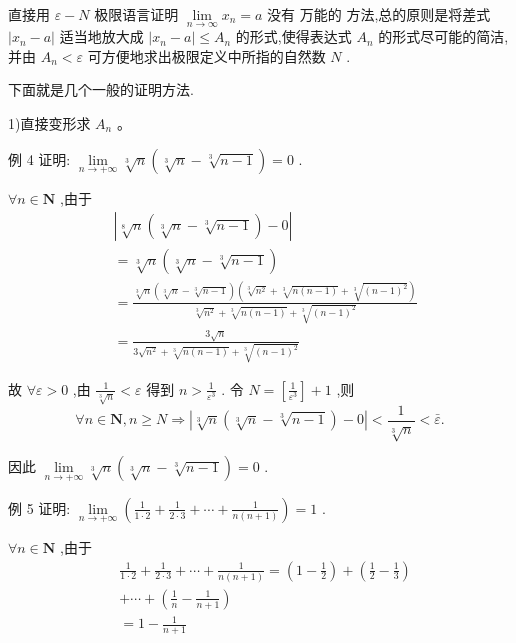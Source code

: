 直接用 $\varepsilon  - N$ 极限语言证明 $\mathop{\lim }\limits_{{n \rightarrow  \infty }}{x}_{n} = a$ 没有 万能的 方法,总的原则是将差式 $\left| {{x}_{n} - a}\right|$ 适当地放大成 $\left| {{x}_{n} - a}\right|  \leq  {A}_{n}$ 的形式,使得表达式 ${A}_{n}$ 的形式尽可能的简洁,并由 ${A}_{n} < \varepsilon$ 可方便地求出极限定义中所指的自然数 $N$ .

下面就是几个一般的证明方法.

1)直接变形求 ${A}_{n}$ 。

例 4 证明: $\mathop{\lim }\limits_{{n \rightarrow   + \infty }}\sqrt[3]{n}\left( {\sqrt[3]{n} - \sqrt[3]{n - 1}}\right)  = 0$ .

$\forall n \in  \mathbf{N}$ ,由于
\begin{align*}
	&\left| {\sqrt[8]{n}\left( {\sqrt[3]{n} - \sqrt[3]{n - 1}}\right)  - 0}\right|\\
	&= \sqrt[3]{n}\left( {\sqrt[3]{n} - \sqrt[3]{n - 1}}\right)\\
	&= \frac{\sqrt[3]{n}\left( {\sqrt[3]{n} - \sqrt[3]{n - 1}}\right) \left( {\sqrt[3]{{n}^{2}} + \sqrt[3]{n\left( {n - 1}\right) } + \sqrt[3]{{\left( n - 1\right) }^{2}}}\right) }{\sqrt[3]{{n}^{2}} + \sqrt[3]{n\left( {n - 1}\right) } + \sqrt[3]{{\left( n - 1\right) }^{2}}}\\
	&= \frac{3\sqrt{n}}{3\sqrt{{n}^{2}} + \sqrt[3]{n\left( {n - 1}\right) } + \sqrt[3]{{\left( n - 1\right) }^{2}}}
\end{align*}

故 $\forall \varepsilon  > 0$ ,由 $\frac{1}{\sqrt[3]{n}} < \varepsilon$ 得到 $n > \frac{1}{{\varepsilon }^{3}}$ . 令 $N = \left\lbrack  \frac{1}{{\varepsilon }^{3}}\right\rbrack   + 1$ ,则
$$\forall n \in  \mathbf{N},n \geq  N \Rightarrow  \left| {\sqrt[3]{n}\left( {\sqrt[3]{n} - \sqrt[3]{n - 1}}\right)  - 0}\right|  < \frac{1}{\sqrt[3]{n}} < \bar{\varepsilon }.$$

因此 $\mathop{\lim }\limits_{{n \rightarrow   + \infty }}\sqrt[3]{n}\left( {\sqrt[3]{n} - \sqrt[3]{n - 1}}\right)  = 0$ .

例 5 证明: $\mathop{\lim }\limits_{{n \rightarrow   + \infty }}\left( {\frac{1}{1 \cdot  2} + \frac{1}{2 \cdot  3} + \cdots  + \frac{1}{n\left( {n + 1}\right) }}\right)  = 1$ .

$\forall n \in  \mathbf{N}$ ,由于
\begin{align*}
	&\frac{1}{1 \cdot  2} + \frac{1}{2 \cdot  3} + \cdots  + \frac{1}{n\left( {n + 1}\right) } = \left( {1 - \frac{1}{2}}\right)  + \left( {\frac{1}{2} - \frac{1}{3}}\right)\\
	&+ \cdots  + \left( {\frac{1}{n} - \frac{1}{n + 1}}\right)\\
	&= 1 - \frac{1}{n + 1}
\end{align*}


